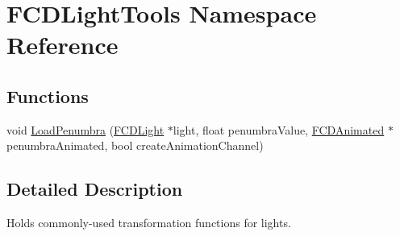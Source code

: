 \hypertarget{namespaceFCDLightTools}{
\section{FCDLightTools Namespace Reference}
\label{namespaceFCDLightTools}
}
\subsection*{Functions}
\begin{DoxyCompactItemize}
\item 
void \hyperlink{namespaceFCDLightTools_ac7e4420bb00c7765b91debb75fbf673f}{LoadPenumbra} (\hyperlink{classFCDLight}{FCDLight} $\ast$light, float penumbraValue, \hyperlink{classFCDAnimated}{FCDAnimated} $\ast$penumbraAnimated, bool createAnimationChannel)
\end{DoxyCompactItemize}


\subsection{Detailed Description}
Holds commonly-\/used transformation functions for lights. 

